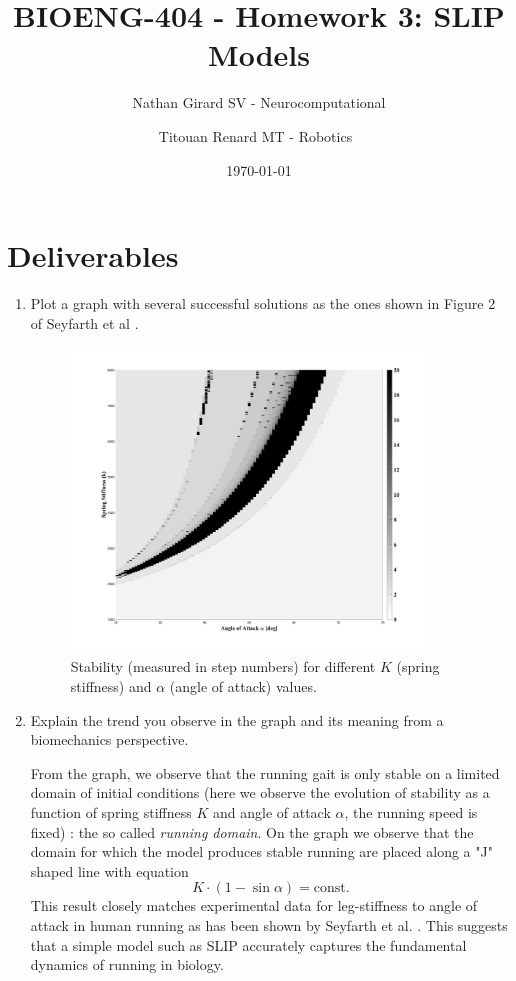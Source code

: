 \documentclass[11pt]{article}
\title{BIOENG-404 - Homework 3: SLIP Models}
\author{
    Nathan Girard
        SV - Neurocomputational
        \and
    Titouan Renard
        MT - Robotics 
}
\date{\today}
\begin{document}
\maketitle

\section{Deliverables}

\begin{enumerate}
    \item Plot a graph with several successful solutions as the ones shown in Figure 2 of Seyfarth et al \cite{1}.
    \begin{adjustwidth}{0.5cm}{}
        \begin{figure}[h!]
            \centering
            \includegraphics[width=0.9\textwidth]{screens/fig_4.jpg}
            \caption{Stability (measured in step numbers) for different $K$ (spring stiffness) and $\alpha$ (angle of attack) values.}
            \label{stability_domain}
        \end{figure}
    \end{adjustwidth}

    \item Explain the trend you observe in the graph and its meaning from a biomechanics perspective.
    \begin{adjustwidth}{0.5cm}{}
        From the graph, we observe that the running gait is only stable on a limited domain of initial conditions (here we observe the evolution of stability as a function of spring stiffness $K$ and angle of attack $\alpha$, the running speed is fixed) : the so called \textit{running domain}. On the graph we observe that the domain for which the model produces stable running are placed along a "J" shaped line with equation 
        \[ K \cdot (1 - \sin \alpha) = \text{const}. \]
        This result closely matches experimental data for leg-stiffness to angle of attack in human running as has been shown by Seyfarth et al. \cite{1}. This suggests that a simple model such as SLIP accurately captures the fundamental dynamics of running in biology.
    \end{adjustwidth}


\end{enumerate}
\end{document}
